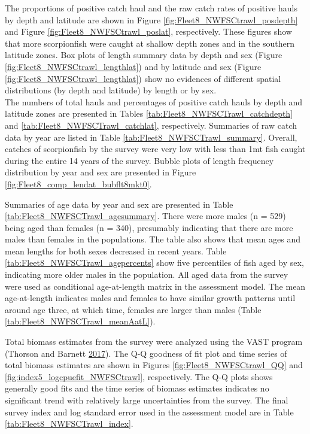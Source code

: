 \documentclass[12pt,]{article}
\begin{document}
The proportions of positive catch haul and the raw catch rates of
positive hauls by depth and latitude are shown in Figure
\ref{fig:Fleet8_NWFSCtrawl_posdepth} and Figure
\ref{fig:Fleet8_NWFSCtrawl_poslat}, respectively. These figures show
that more scorpionfish were caught at shallow depth zones and in the
southern latitude zones. Box plots of length summary data by depth and
sex (Figure \ref{fig:Fleet8_NWFSCtrawl_lengthlat}) and by latitude and
sex (Figure \ref{fig:Fleet8_NWFSCtrawl_lengthlat}) show no evidences of
different spatial distributions (by depth and latitude) by length or by
sex.\\
The numbers of total hauls and percentages of positive catch hauls by
depth and latitude zones are presented in Tables
\ref{tab:Fleet8_NWFSCTrawl_catchdepth} and
\ref{tab:Fleet8_NWFSCTrawl_catchlat}, respectively. Summaries of raw
catch data by year are listed in Table
\ref{tab:Fleet8_NWFSCTrawl_summary}. Overall, catches of scorpionfish by
the survey were very low with less than 1mt fish caught during the
entire 14 years of the survey. Bubble plots of length frequency
distribution by year and sex are presented in Figure
\ref{fig:Fleet8_comp_lendat_bubflt8mkt0}.

Summaries of age data by year and sex are presented in Table
\ref{tab:Fleet8_NWFSCTrawl_agesummary}. There were more males (n = 529)
being aged than females (n = 340), presumably indicating that there are
more males than females in the populations. The table also shows that
mean ages and mean lengths for both sexes decreased in recent years.
Table \ref{tab:Fleet8_NWFSCTrawl_agepercents} show five percentiles of
fish aged by sex, indicating more older males in the population. All
aged data from the survey were used as conditional age-at-length matrix
in the assessment model. The mean age-at-length indicates males and
females to have similar growth patterns until around age three, at which
time, females are larger than males (Table
\ref{tab:Fleet8_NWFSCTrawl_meanAatL}).

Total biomass estimates from the survey were analyzed using the VAST
program (Thorson and Barnett \protect\hyperlink{ref-Thorson2017}{2017}).
The Q-Q goodness of fit plot and time series of total biomass estimates
are shown in Figures \ref{fig:Fleet8_NWFSCtrawl_QQ} and
\ref{fig:index5_logcpuefit_NWFSCtrawl}, respectively. The Q-Q plots
shows generally good fits and the time series of biomass estimates
indicates no significant trend with relatively large uncertainties from
the survey. The final survey index and log standard error used in the
assessment model are in Table \ref{tab:Fleet8_NWFSCTrawl_index}.
\end{document}
